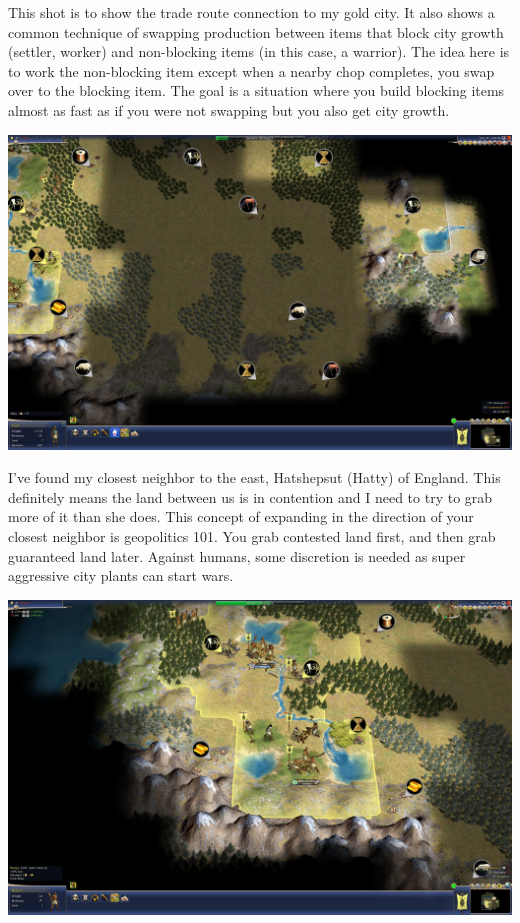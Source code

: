 \documentclass[10pt]{article}
\begin{document}
This shot is to show the trade route connection to my gold city. It also shows a common technique of
swapping production between items that block city growth (settler, worker) and non-blocking items (in
this case, a warrior). The idea here is to work the non-blocking item except when a nearby chop completes,
you swap over to the blocking item. The goal is a situation where you build blocking items almost as fast
as if you were not swapping but you also get city growth.

\includegraphics[width=1.0\textwidth]{19}

I've found my closest neighbor to the east, Hatshepsut (Hatty) of England. This definitely means the land
between us is in contention and I need to try to grab more of it than she does. This concept of expanding
in the direction of your closest neighbor is geopolitics 101. You grab contested land first, and then
grab guaranteed land later. Against humans, some discretion is needed as super aggressive city plants
can start wars.

\includegraphics[width=1.0\textwidth]{21}
\end{document}
